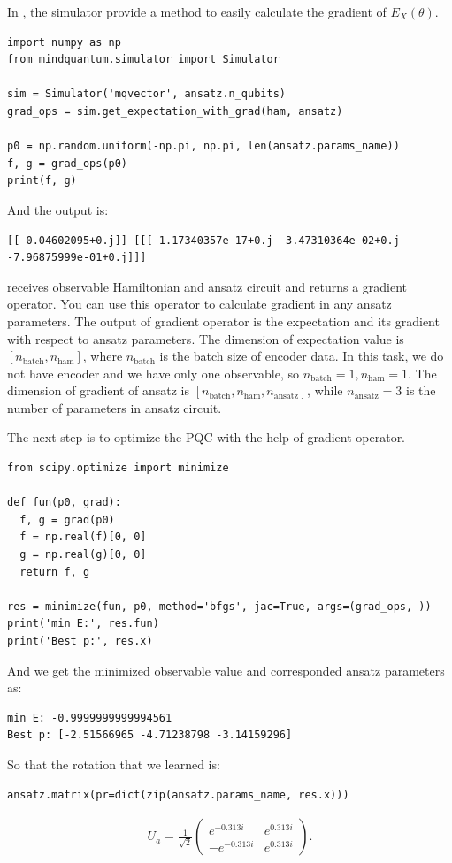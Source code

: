 In \MindQuantum, the simulator provide a method \getexpectationwithgrad to easily calculate the gradient of $E_X(\theta)$.

\begin{lstlisting}
import numpy as np
from mindquantum.simulator import Simulator

sim = Simulator('mqvector', ansatz.n_qubits)
grad_ops = sim.get_expectation_with_grad(ham, ansatz)

p0 = np.random.uniform(-np.pi, np.pi, len(ansatz.params_name))
f, g = grad_ops(p0)
print(f, g)
\end{lstlisting}
And the output is:
\begin{lstlisting}
[[-0.04602095+0.j]] [[[-1.17340357e-17+0.j -3.47310364e-02+0.j -7.96875999e-01+0.j]]]
\end{lstlisting}

\getexpectationwithgrad receives observable Hamiltonian and ansatz circuit and returns a gradient operator. You can use this operator to calculate gradient in any ansatz parameters. The output of gradient operator is the expectation and its gradient with respect to ansatz parameters. The dimension of expectation value is $[n_\text{batch}, n_\text{ham}]$, where $n_\text{batch}$ is the batch size of encoder data. In this task, we do not have encoder and we have only one observable, so $n_\text{batch}=1, n_\text{ham}=1$. The dimension of gradient of ansatz is $[n_\text{batch}, n_\text{ham}, n_\text{ansatz}]$, while $n_\text{ansatz} = 3$ is the number of parameters in ansatz circuit.

The next step is to optimize the PQC with the help of gradient operator.
\begin{lstlisting}
from scipy.optimize import minimize

def fun(p0, grad):
  f, g = grad(p0)
  f = np.real(f)[0, 0]
  g = np.real(g)[0, 0]
  return f, g

res = minimize(fun, p0, method='bfgs', jac=True, args=(grad_ops, ))
print('min E:', res.fun)
print('Best p:', res.x)
\end{lstlisting}
And we get the minimized observable value and corresponded ansatz parameters as:
\begin{lstlisting}
min E: -0.9999999999994561
Best p: [-2.51566965 -4.71238798 -3.14159296]
\end{lstlisting}
So that the rotation that we learned is:
\begin{lstlisting}
ansatz.matrix(pr=dict(zip(ansatz.params_name, res.x)))
\end{lstlisting}
\begin{align*}
  U_a=\frac{1}{\sqrt{2}}\begin{pmatrix}
    e^{-0.313i}  & e^{0.313i} \\
    -e^{-0.313i} & e^{0.313i}
  \end{pmatrix}.
\end{align*}

